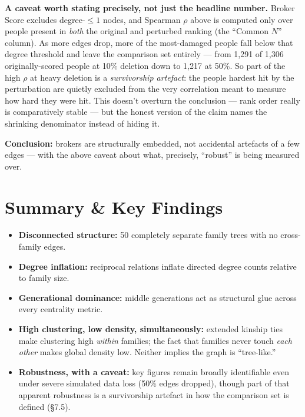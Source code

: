 \documentclass[11pt,a4paper]{article}
\begin{document}
\begin{why}
\textbf{A caveat worth stating precisely, not just the headline number.}
Broker Score excludes degree-$\leq 1$ nodes, and Spearman $\rho$ above is
computed only over people present in \emph{both} the original and
perturbed ranking (the ``Common $N$'' column). As more edges drop, more of
the most-damaged people fall below that degree threshold and leave the
comparison set entirely --- from 1{,}291 of 1{,}306 originally-scored
people at 10\% deletion down to 1{,}217 at 50\%. So part of the high
$\rho$ at heavy deletion is a \emph{survivorship artefact}: the people
hardest hit by the perturbation are quietly excluded from the very
correlation meant to measure how hard they were hit. This doesn't
overturn the conclusion --- rank order really is comparatively stable ---
but the honest version of the claim names the shrinking denominator
instead of hiding it.
\end{why}

\textbf{Conclusion:} brokers are structurally embedded, not accidental
artefacts of a few edges --- with the above caveat about what, precisely,
``robust'' is being measured over.

\section{Summary \& Key Findings}

\begin{itemize}[leftmargin=1.4em,itemsep=3pt]
\item \textbf{Disconnected structure:} 50 completely separate family
      trees with no cross-family edges.
\item \textbf{Degree inflation:} reciprocal relations inflate directed
      degree counts relative to family size.
\item \textbf{Generational dominance:} middle generations act as
      structural glue across every centrality metric.
\item \textbf{High clustering, low density, simultaneously:} extended
      kinship ties make clustering high \emph{within} families; the fact
      that families never touch \emph{each other} makes global density
      low. Neither implies the graph is ``tree-like.''
\item \textbf{Robustness, with a caveat:} key figures remain broadly
      identifiable even under severe simulated data loss (50\% edges
      dropped), though part of that apparent robustness is a
      survivorship artefact in how the comparison set is defined (\S7.5).
\end{itemize}
\end{document}
